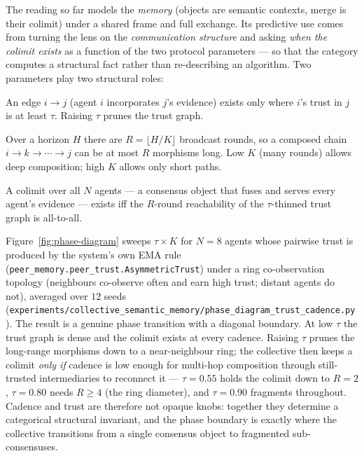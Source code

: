 \documentclass{article}
\newcommand{\method}[1]{\texttt{#1}}
\begin{document}
The reading so far models the \emph{memory} (objects are semantic contexts,
merge is their colimit) under a shared frame and full exchange. Its
predictive use comes from turning the lens on the \emph{communication
structure} and asking \emph{when the colimit exists} as a function of the two
protocol parameters --- so that the category computes a structural fact rather
than re-describing an algorithm. Two parameters play two structural roles:
\begin{description}[leftmargin=12pt,topsep=2pt,itemsep=1pt]
\item[Trust $\tau$ gates morphisms.] An edge $i\!\to\!j$ (agent $i$
incorporates $j$'s evidence) exists only where $i$'s trust in $j$ is at least
$\tau$. Raising $\tau$ prunes the trust graph.
\item[Cadence $K$ gates composition depth.] Over a horizon $H$ there are
$R=\lfloor H/K\rfloor$ broadcast rounds, so a composed chain
$i\!\to\!k\!\to\!\cdots\!\to\!j$ can be at most $R$ morphisms long. Low $K$
(many rounds) allows deep composition; high $K$ allows only short paths.
\end{description}
A colimit over all $N$ agents --- a consensus object that fuses and serves
every agent's evidence --- exists iff the $R$-round reachability of the
$\tau$-thinned trust graph is all-to-all.

Figure~\ref{fig:phase-diagram} sweeps $\tau\times K$ for $N{=}8$ agents whose
pairwise trust is produced by the system's own EMA rule
(\method{peer\_memory.peer\_trust.AsymmetricTrust}) under a ring co-observation
topology (neighbours co-observe often and earn high trust; distant agents do
not), averaged over $12$ seeds
(\method{experiments/collective\_semantic\_memory/phase\_diagram\_trust\_cadence.py}).
The result is a genuine phase transition with a diagonal boundary. At low
$\tau$ the trust graph is dense and the colimit exists at every cadence.
Raising $\tau$ prunes the long-range morphisms down to a near-neighbour ring;
the collective then keeps a colimit \emph{only if} cadence is low enough for
multi-hop composition through still-trusted intermediaries to reconnect it ---
$\tau{=}0.55$ holds the colimit down to $R{=}2$, $\tau{=}0.80$ needs $R\ge4$
(the ring diameter), and $\tau{=}0.90$ fragments throughout. Cadence and trust
are therefore not opaque knobs: together they determine a categorical
structural invariant, and the phase boundary is exactly where the collective
transitions from a single consensus object to fragmented sub-consensuses.
\end{document}
